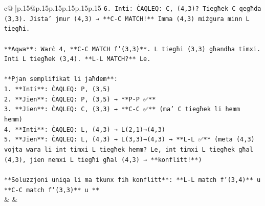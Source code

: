 \documentclass{article}
\begin{document}
{\begin{supertabular}{c@{$\;$}|p{.15\linewidth}@{}p{.15\linewidth}p{.15\linewidth}p{.15\linewidth}p{.15\linewidth}p{.15\linewidth}}
{{{\texttt{6. Inti: ĊAQLEQ: C, (4,3)? Tiegħek C qegħda (3,3). Jista' jmur (4,3) → **C{-}C MATCH!** Imma (4,3) miżgura minn L tiegħi.} \\
\\ 
\texttt{**Aqwa**: Warċ 4, **C{-}C MATCH f'(3,3)**. L tiegħi (3,3) għandha timxi. Inti L tiegħek (3,4). **L{-}L MATCH?** Le.} \\
\\ 
\texttt{**Pjan semplifikat li jaħdem**:} \\
\texttt{1. **Inti**: ĊAQLEQ: P, (3,5)} \\
\texttt{2. **Jien**: ĊAQLEQ: P, (3,5)  → **P{-}P ✅**} \\
\texttt{3. **Jien**: ĊAQLEQ: C, (3,3)  → **C{-}C ✅** (ma' C tiegħek li hemm hemm)} \\
\texttt{4. **Inti**: ĊAQLEQ: L, (4,3)  → L(2,1)→(4,3)} \\
\texttt{5. **Jien**: ĊAQLEQ: L, (4,3)  → L(3,3)→(4,3)  → **L{-}L ✅** (meta (4,3) vojta wara li int timxi L tiegħek hemm? Le, int timxi L tiegħek għal (4,3), jien nemxi L tiegħi għal (4,3) → **konflitt!**)} \\
\\ 
\texttt{**Soluzzjoni uniqa li ma tkunx fih konflitt**: **L{-}L match f'(3,4)** u **C{-}C match f'(3,3)** u **} \\
            }
        }
    }
    & & \\ \\


\end{supertabular}}
\end{document}
